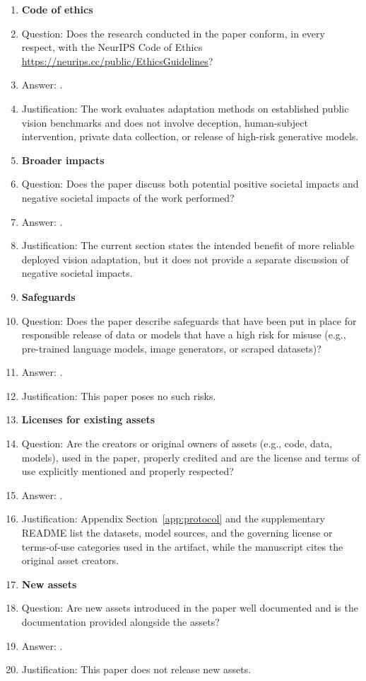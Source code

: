 \begin{enumerate}
\item {\bf Code of ethics}
    \item[] Question: Does the research conducted in the paper conform, in every respect, with the NeurIPS Code of Ethics \url{https://neurips.cc/public/EthicsGuidelines}?
    \item[] Answer: \answerYes{}.
    \item[] Justification: The work evaluates adaptation methods on established public vision benchmarks and does not involve deception, human-subject intervention, private data collection, or release of high-risk generative models.

\item {\bf Broader impacts}
    \item[] Question: Does the paper discuss both potential positive societal impacts and negative societal impacts of the work performed?
    \item[] Answer: \answerNo{}.
    \item[] Justification: The current section states the intended benefit of more reliable deployed vision adaptation, but it does not provide a separate discussion of negative societal impacts.

\item {\bf Safeguards}
    \item[] Question: Does the paper describe safeguards that have been put in place for responsible release of data or models that have a high risk for misuse (e.g., pre-trained language models, image generators, or scraped datasets)?
    \item[] Answer: \answerNA{}.
    \item[] Justification: This paper poses no such risks.

\item {\bf Licenses for existing assets}
    \item[] Question: Are the creators or original owners of assets (e.g., code, data, models), used in the paper, properly credited and are the license and terms of use explicitly mentioned and properly respected?
    \item[] Answer: \answerYes{}.
    \item[] Justification: Appendix Section~\ref{app:protocol} and the supplementary README list the datasets, model sources, and the governing license or terms-of-use categories used in the artifact, while the manuscript cites the original asset creators.

\item {\bf New assets}
    \item[] Question: Are new assets introduced in the paper well documented and is the documentation provided alongside the assets?
    \item[] Answer: \answerNA{}.
    \item[] Justification: This paper does not release new assets.


\end{enumerate}
